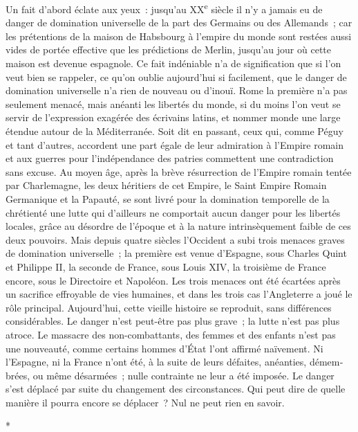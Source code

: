 \documentclass[french,twoside]{book} %
\begin{document}
Un fait d'abord éclate aux yeux : jusqu'au XX\textsuperscript{e} siècle il n'y a jamais eu de danger de domination universelle de la part des Germains ou des Allemands ; car les prétentions de la maison de Habsbourg à l'empire du monde sont restées aussi vides de portée effective que les prédictions de Merlin, jusqu'au jour où cette maison est devenue espagnole. Ce fait indéniable n'a de signifi­cation que si l'on veut bien se rappeler, ce qu'on oublie aujourd'hui si facile­ment, que le danger de domination universelle n'a rien de nouveau ou d'inouï. Rome la première n'a pas seulement menacé, mais anéanti les libertés du monde, si du moins l'on veut se servir de l'expression exagérée des écrivains latins, et nommer monde une large étendue autour de la Méditerranée. Soit dit en passant, ceux qui, comme Péguy et tant d'autres, accordent une part égale de leur admiration à l'Empire romain et aux guerres pour l'indépendance des patries commettent une contradiction sans excuse. Au moyen âge, après la brève résurrection de l'Empire romain tentée par Charlemagne, les deux héri­tiers de cet Empire, le Saint Empire Romain Germanique et la Papauté, se sont livré pour la domination temporelle de la chrétienté une lutte qui d'ailleurs ne comportait aucun danger pour les libertés locales, grâce au désordre de l'époque et à la nature intrinsèquement faible de ces deux pouvoirs. Mais depuis quatre siècles l'Occident a subi trois menaces graves de domination universelle ; la première est venue d'Espagne, sous Charles Quint et Philippe II, la seconde de France, sous Louis XIV, la troisième de France encore, sous le Directoire et Napoléon. Les trois menaces ont été écartées après un sacrifice effroyable de vies humaines, et dans les trois cas l'Angleterre a joué le rôle principal. Aujourd'hui, cette vieille histoire se reproduit, sans différences considérables. Le danger n'est peut-être pas plus grave ; la lutte n'est pas plus atroce. Le massacre des non-combattants, des femmes et des enfants n'est pas une nouveauté, comme certains hommes d'État l'ont affirmé naïvement. Ni l'Espagne, ni la France n'ont été, à la suite de leurs défaites, anéanties, démem­brées, ou même désarmées ; nulle contrainte ne leur a été imposée. Le danger s'est déplacé par suite du changement des circonstances. Qui peut dire de quelle manière il pourra encore se déplacer ? Nul ne peut rien en savoir.\par

\begin{center}
*\end{center}
\end{document}
